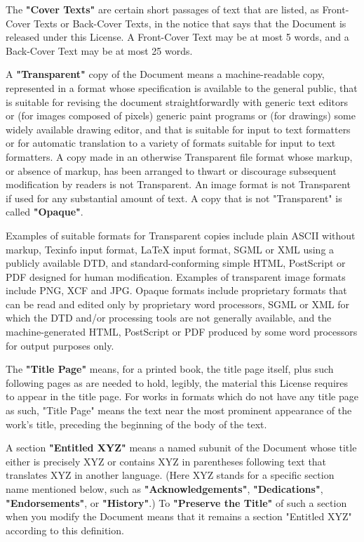 The \textbf{"Cover Texts"} are certain short passages of text that are listed,
as Front-Cover Texts or Back-Cover Texts, in the notice that says that
the Document is released under this License.  A Front-Cover Text may
be at most 5 words, and a Back-Cover Text may be at most 25 words.

A \textbf{"Transparent"} copy of the Document means a machine-readable copy,
represented in a format whose specification is available to the
general public, that is suitable for revising the document
straightforwardly with generic text editors or (for images composed of
pixels) generic paint programs or (for drawings) some widely available
drawing editor, and that is suitable for input to text formatters or
for automatic translation to a variety of formats suitable for input
to text formatters.  A copy made in an otherwise Transparent file
format whose markup, or absence of markup, has been arranged to thwart
or discourage subsequent modification by readers is not Transparent.
An image format is not Transparent if used for any substantial amount
of text.  A copy that is not "Transparent" is called \textbf{"Opaque"}.

Examples of suitable formats for Transparent copies include plain
ASCII without markup, Texinfo input format, LaTeX input format, SGML
or XML using a publicly available DTD, and standard-conforming simple
HTML, PostScript or PDF designed for human modification.  Examples of
transparent image formats include PNG, XCF and JPG.  Opaque formats
include proprietary formats that can be read and edited only by
proprietary word processors, SGML or XML for which the DTD and/or
processing tools are not generally available, and the
machine-generated HTML, PostScript or PDF produced by some word
processors for output purposes only.

The \textbf{"Title Page"} means, for a printed book, the title page itself,
plus such following pages as are needed to hold, legibly, the material
this License requires to appear in the title page.  For works in
formats which do not have any title page as such, "Title Page" means
the text near the most prominent appearance of the work's title,
preceding the beginning of the body of the text.

A section \textbf{"Entitled XYZ"} means a named subunit of the Document whose
title either is precisely XYZ or contains XYZ in parentheses following
text that translates XYZ in another language.  (Here XYZ stands for a
specific section name mentioned below, such as \textbf{"Acknowledgements"},
\textbf{"Dedications"}, \textbf{"Endorsements"}, or \textbf{"History"}.)  
To \textbf{"Preserve the Title"}
of such a section when you modify the Document means that it remains a
section "Entitled XYZ" according to this definition.

